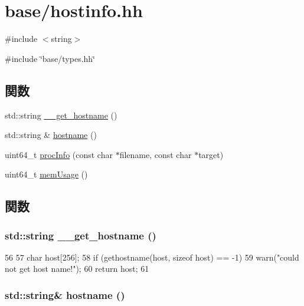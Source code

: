\hypertarget{hostinfo_8hh}{
\section{base/hostinfo.hh}
\label{hostinfo_8hh}
}
{\ttfamily \#include $<$string$>$}\par
{\ttfamily \#include \char`\"{}base/types.hh\char`\"{}}\par
\subsection*{関数}
\begin{DoxyCompactItemize}
\item 
std::string \hyperlink{hostinfo_8hh_a869f93f94aa9f8c038e4b71d01c2e404}{\_\-\_\-get\_\-hostname} ()
\item 
std::string \& \hyperlink{hostinfo_8hh_a5beda2563652aebef726573dff1e3d6a}{hostname} ()
\item 
uint64\_\-t \hyperlink{hostinfo_8hh_af828f458b0892e2778f8ffb6ed6f0610}{procInfo} (const char $\ast$filename, const char $\ast$target)
\item 
uint64\_\-t \hyperlink{hostinfo_8hh_af25c7a8864229307a3f0523a45328c9b}{memUsage} ()
\end{DoxyCompactItemize}


\subsection{関数}
\hypertarget{hostinfo_8hh_a869f93f94aa9f8c038e4b71d01c2e404}{
\subsubsection[{\_\-\_\-get\_\-hostname}]{\setlength{\rightskip}{0pt plus 5cm}std::string \_\-\_\-get\_\-hostname ()}}
\label{hostinfo_8hh_a869f93f94aa9f8c038e4b71d01c2e404}



\begin{DoxyCode}
56 {
57     char host[256];
58     if (gethostname(host, sizeof host) == -1)
59         warn("could not get host name!");
60     return host;
61 }
\end{DoxyCode}
\hypertarget{hostinfo_8hh_a5beda2563652aebef726573dff1e3d6a}{
\subsubsection[{hostname}]{\setlength{\rightskip}{0pt plus 5cm}std::string\& hostname ()}}
\label{hostinfo_8hh_a5beda2563652aebef726573dff1e3d6a}



